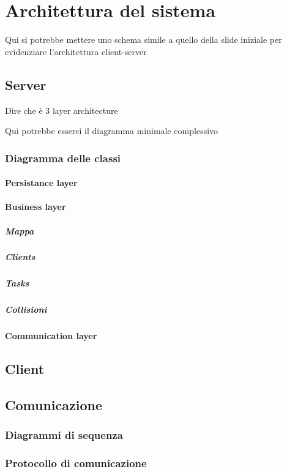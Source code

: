 \section{Architettura del sistema}


Qui si potrebbe mettere uno schema simile a quello della slide iniziale per evidenziare l'architettura client-server



\subsection{Server}

Dire che è 3 layer architecture

Qui potrebbe esserci il diagramma minimale complessivo


\subsubsection{Diagramma delle classi}


\paragraph{Persistance layer}


\paragraph{Business layer}

\subparagraph{Mappa}

\subparagraph{Clients}

\subparagraph{Tasks}

\subparagraph{Collisioni}


\paragraph{Communication layer}



\subsection{Client}


\subsection{Comunicazione}

\subsubsection{Diagrammi di sequenza}

\subsubsection{Protocollo di comunicazione}


